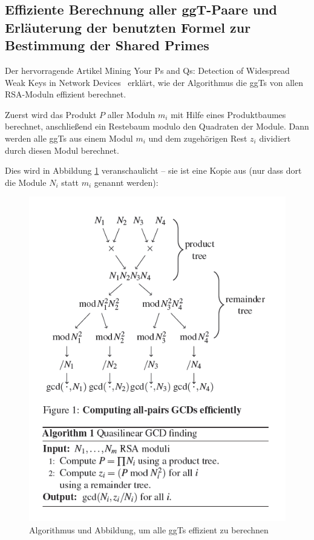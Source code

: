 \begin{refsegment}
\clearpage
\section*{Effiziente Berechnung aller ggT-Paare und Erläuterung der benutzten Formel zur Bestimmung der Shared Primes}

Der hervorragende Artikel \glqq Mining Your Ps and Qs: Detection of Widespread Weak Keys in Network Devices\grqq~\cite{Heninger2012} erklärt, wie der Algorithmus die ggTs von allen RSA-Moduln effizient berechnet.

Zuerst wird das Produkt $P$ aller Moduln $m_{i}$ mit Hilfe eines Produktbaumes berechnet, anschließend ein Restebaum modulo den Quadraten der Module. Dann werden alle ggTs aus einem Modul $m_{i}$ und dem zugehörigen Rest $z_{i}$ dividiert durch diesen Modul berechnet.

Dies wird in Abbildung \ref{Figure_Bernstein_Computing-all-pairs-GCDs} veranschaulicht -- sie ist eine Kopie aus \cite{Heninger2012} (nur dass dort die Module $N_{i}$ statt $m_{i}$ genannt werden):
\begin{figure}[ht]
\begin{center}
\includegraphics[scale=0.7]{figures/Bernstein_Computing-all-pairs-GCDs.png}
\caption{Algorithmus und Abbildung, um alle ggTs effizient zu berechnen}
\label{Figure_Bernstein_Computing-all-pairs-GCDs}
\end{center}
\end{figure}



\end{refsegment}
